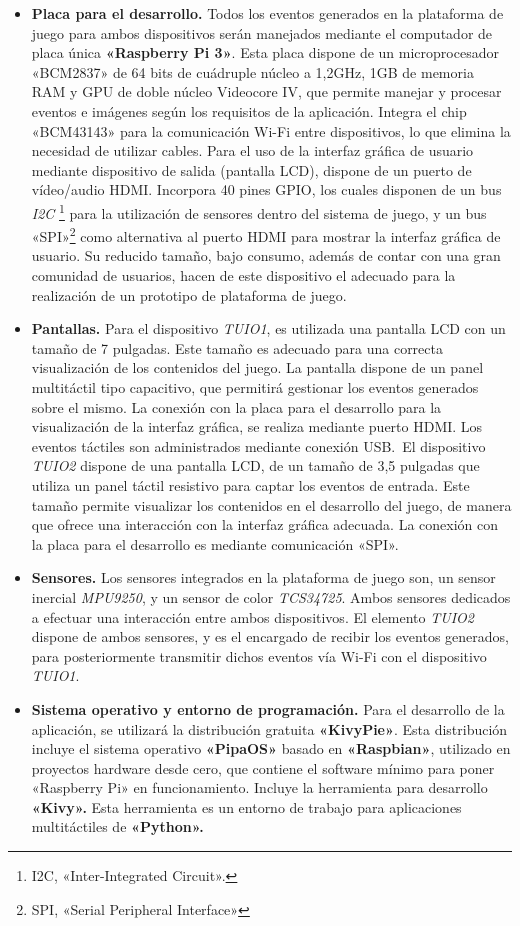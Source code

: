 \begin{itemize}
\item \textbf{Placa para el desarrollo.} Todos los eventos generados en la plataforma de juego para ambos dispositivos serán manejados mediante el computador de placa única \textbf{«Raspberry Pi 3»}. Esta placa dispone de un microprocesador «BCM2837» de 64 bits de cuádruple núcleo a 1,2GHz, 1GB de memoria RAM y GPU de doble núcleo Videocore IV, que permite manejar y procesar eventos e imágenes según los requisitos de la aplicación.
Integra el chip «BCM43143» para la comunicación Wi-Fi entre dispositivos, lo que elimina la necesidad de utilizar cables. Para el uso de la interfaz gráfica de usuario mediante dispositivo de salida (pantalla LCD), dispone de un puerto de vídeo/audio HDMI. Incorpora 40 pines GPIO, los cuales disponen de un bus \emph{I2C} \footnote{I2C, «Inter-Integrated Circuit».} para la utilización de sensores dentro del sistema de juego, y un bus «SPI»\footnote{SPI, «Serial Peripheral Interface» } como alternativa al puerto HDMI para mostrar la interfaz gráfica de usuario.
Su reducido tamaño, bajo consumo, además de contar con una gran comunidad de usuarios, hacen de este dispositivo el adecuado para la realización de un prototipo de plataforma de juego.
\item \textbf{Pantallas.} Para el dispositivo \emph{TUIO1}, es utilizada una pantalla LCD con un tamaño de 7 pulgadas. Este tamaño es adecuado para una correcta visualización de los contenidos del juego. La pantalla dispone de un panel multitáctil tipo capacitivo, que permitirá gestionar los eventos generados sobre el mismo. La conexión con la placa para el desarrollo para la visualización de la interfaz gráfica, se realiza mediante puerto HDMI.
Los eventos táctiles son administrados mediante conexión USB.\
El dispositivo \emph{TUIO2} dispone de una pantalla LCD, de un tamaño de 3,5 pulgadas que utiliza un panel táctil resistivo para captar los eventos de entrada. Este tamaño permite visualizar los contenidos en el desarrollo del juego, de manera que ofrece una interacción con la interfaz gráfica adecuada. La conexión con la placa para el desarrollo es mediante comunicación «SPI».
\item \textbf{Sensores.} Los sensores integrados en la plataforma de juego son, un sensor inercial \emph{MPU9250}, y un sensor de color \emph{TCS34725}. Ambos sensores dedicados a efectuar una interacción entre ambos dispositivos. El elemento \emph{TUIO2} dispone de ambos sensores, y es el encargado de recibir los eventos generados, para posteriormente transmitir dichos eventos vía Wi-Fi con el dispositivo \emph{TUIO1}.\

\item \textbf{Sistema operativo y entorno de programación.} Para el desarrollo de la aplicación, se utilizará la distribución gratuita \textbf{«KivyPie»}. Esta distribución incluye el sistema operativo \textbf{«PipaOS»} basado en \textbf{«Raspbian»}, utilizado en proyectos hardware desde cero, que contiene el software mínimo para poner «Raspberry Pi» en funcionamiento. Incluye la herramienta para desarrollo \textbf{«Kivy».} Esta herramienta es un entorno de trabajo para aplicaciones multitáctiles de \textbf{«Python».}
\end{itemize}

